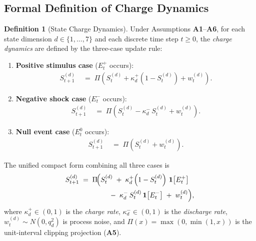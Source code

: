 \documentclass[12pt,openany]{book}
\numberwithin{equation}{chapter}
\theoremstyle{plain}
\theoremstyle{definition}
\newtheorem{definition}[theorem]{Definition}
\theoremstyle{remark}
\def\mathcal#1{#1}%
\begin{document}
\subsection{Formal Definition of Charge Dynamics}
\label{subsec:charge-dynamics-def}

\begin{definition}[State Charge Dynamics]
\label{def:charge-dynamics}
Under Assumptions \textbf{A1}--\textbf{A6}, for each state
dimension $d \in \{1, \ldots, 7\}$ and each discrete time step
$t \geq 0$, the \emph{charge dynamics} are defined by the
three-case update rule:
\begin{enumerate}
  \item \textbf{Positive stimulus case} ($E_t^{+}$ occurs):
    \begin{align}
      \mathcal{S}_{t+1}^{(d)}
        &\;=\; \Pi\!\left(
            \mathcal{S}_t^{(d)}
            + \kappa_d^{+}\!\left(1 - \mathcal{S}_t^{(d)}\right)
            + w_t^{(d)}
          \right).
      \label{eq:charge-pos}
    \end{align}
  \item \textbf{Negative shock case} ($E_t^{-}$ occurs):
    \begin{align}
      \mathcal{S}_{t+1}^{(d)}
        &\;=\; \Pi\!\left(
            \mathcal{S}_t^{(d)}
            - \kappa_d^{-}\,\mathcal{S}_t^{(d)}
            + w_t^{(d)}
          \right).
      \label{eq:charge-neg}
    \end{align}
  \item \textbf{Null event case} ($E_t^{0}$ occurs):
    \begin{align}
      \mathcal{S}_{t+1}^{(d)}
        &\;=\; \Pi\!\left(
            \mathcal{S}_t^{(d)}
            + w_t^{(d)}
          \right).
      \label{eq:charge-null}
    \end{align}
\end{enumerate}
The unified compact form combining all three cases is
\begin{align}
  \mathcal{S}_{t+1}^{(d)}
    &\;=\; \Pi\!\Bigl(
        \mathcal{S}_t^{(d)}
        \;+\; \kappa_d^{+}\!\left(1 - \mathcal{S}_t^{(d)}\right)
          \,\mathbf{1}\!\left[E_t^{+}\right]
        \notag \\
        &\qquad\qquad
        \;-\; \kappa_d^{-}\,\mathcal{S}_t^{(d)}
          \,\mathbf{1}\!\left[E_t^{-}\right]
        \;+\; w_t^{(d)}
      \Bigr),
  \label{eq:charge-dynamics}
\end{align}
where $\kappa_d^{+} \in (0,1)$ is the \emph{charge rate},
$\kappa_d^{-} \in (0,1)$ is the \emph{discharge rate},
$w_t^{(d)} \sim \mathcal{N}(0,q_d^2)$ is process noise, and
$\Pi(x) = \max(0,\min(1,x))$ is the unit-interval clipping
projection (\textbf{A5}).


\end{definition}
\end{document}
